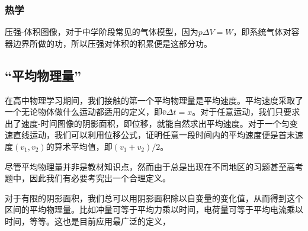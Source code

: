 \subsubsection{热学}
压强-体积图像，对于中学阶段常见的气体模型，因为$p\Delta V=W$，即系统气体对容器边界所做的功，所以压强对体积的积累便是这部分功。
\subsection{“平均物理量”}
在高中物理学习期间，我们接触的第一个平均物理量是平均速度。平均速度采取了一个无论物体做什么运动都适用的定义，即$\bar v\Delta t=x$。对于任意运动，我们只要求出了速度-时间图像的阴影面积，即位移，就能自然求出平均速度。对于一个匀变速直线运动，我们可以利用位移公式，证明任意一段时间内的平均速度便是首末速度$(v_1,v_2)$的算术平均值，即$(v_1+v_2)/2$。

尽管平均物理量并非是教材知识点，然而由于总是出现在不同地区的习题甚至高考题中，因此我们有必要考究出一个合理定义。

对于有限的阴影面积，我们总可以用阴影面积除以自变量的变化值，从而得到这个区间的平均物理量。比如冲量可等于平均力乘以时间，电荷量可等于平均电流乘以时间，等等。这也是目前应用最广泛的定义，